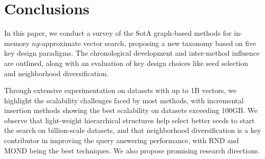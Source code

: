 \section{Conclusions}
\label{sec:conclusions}
In this paper, we conduct a survey of the SotA graph-based methods for in-memory $ng$-approximate vector search, proposing a new taxonomy based on five key design paradigms.
The chronological development and inter-method influence are outlined, along with an evaluation of key design choices like seed selection and neighborhood diversification. 

Through extensive experimentation on datasets with up to 1B vectors, we highlight the scalability challenges faced by most methods, with incremental insertion methods showing the best scalability on datasets exceeding 100GB. 
We observe that light-weight hierarchical structures help select better seeds to start the search on billion-scale datasets, and that neighborhood diversification is a key contributor in improving the query answering performance, with RND and MOND being the best techniques. 
We also propose promising research directions.

